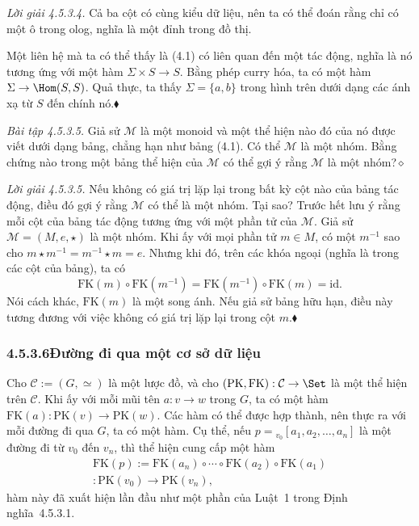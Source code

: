 \noindent\textit{Lời giải 4.5.3.4.}\keepwithnext
Cả ba cột có cùng kiểu dữ liệu, nên ta có thể đoán rằng chỉ có một ô trong olog, nghĩa là một đỉnh trong đồ thị.
\begin{center}
\end{center}
Một liên hệ mà ta có thể thấy là (4.1) có liên quan đến một tác động, nghĩa là nó tương ứng với một hàm $\Sigma\times S\to S$. Bằng phép curry hóa, ta có một hàm $\Sigma\to\Hom(S,S)$. Quả thực, ta thấy $\Sigma=\{a,b\}$ trong hình trên dưới dạng các ánh xạ từ $S$ đến chính nó.\nobreak\hfill$\blacklozenge$

\noindent\textit{Bài tập 4.5.3.5.}\keepwithnext
Giả sử $\mathcal M$ là một monoid và một thể hiện nào đó của nó được viết dưới dạng bảng, chẳng hạn như bảng (4.1). Có thể $\mathcal M$ là một nhóm. Bằng chứng nào trong một bảng thể hiện của $\mathcal M$ có thể gợi ý rằng $\mathcal M$ là một nhóm?\nobreak\hfill$\diamond$

\noindent\textit{Lời giải 4.5.3.5.}\keepwithnext
Nếu không có giá trị lặp lại trong bất kỳ cột nào của bảng tác động, điều đó gợi ý rằng $\mathcal M$ có thể là một nhóm. Tại sao? Trước hết lưu ý rằng mỗi cột của bảng tác động tương ứng với một phần tử của $\mathcal M$. Giả sử $\mathcal M=(M,e,\star)$ là một nhóm. Khi ấy với mọi phần tử $m\in M$, có một $m^{-1}$ sao cho $m\star m^{-1}=m^{-1}\star m=e$. Nhưng khi đó, trên các khóa ngoại (nghĩa là trong các cột của bảng), ta có
\[
\mathrm{FK}(m)\circ\mathrm{FK}(m^{-1})=\mathrm{FK}(m^{-1})\circ\mathrm{FK}(m)=\mathrm{id}.
\]
Nói cách khác, $\mathrm{FK}(m)$ là một song ánh. Nếu giả sử bảng hữu hạn, điều này tương đương với việc không có giá trị lặp lại trong cột $m$.\nobreak\hfill$\blacklozenge$

\subsubsection*{4.5.3.6\quad Đường đi qua một cơ sở dữ liệu}

Cho $\mathcal C:=(G,\simeq)$ là một lược đồ, và cho $(\mathrm{PK},\mathrm{FK}):\mathcal C\to\Set$ là một thể hiện trên $\mathcal C$. Khi ấy với mỗi mũi tên $a:v\to w$ trong $G$, ta có một hàm $\mathrm{FK}(a):\mathrm{PK}(v)\to\mathrm{PK}(w)$. Các hàm có thể được hợp thành, nên thực ra với mỗi đường đi qua $G$, ta có một hàm. Cụ thể, nếu $p={}_{v_0}[a_1,a_2,\ldots,a_n]$ là một đường đi từ $v_0$ đến $v_n$, thì thể hiện cung cấp một hàm
\[
\begin{gathered}
\mathrm{FK}(p):=\mathrm{FK}(a_n)\circ\cdots\circ\mathrm{FK}(a_2)\circ\mathrm{FK}(a_1)\\
:\mathrm{PK}(v_0)\longrightarrow\mathrm{PK}(v_n),
\end{gathered}
\]
hàm này đã xuất hiện lần đầu như một phần của Luật~1 trong Định nghĩa~4.5.3.1.

